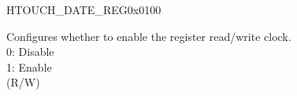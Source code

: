 \begin{register}{H}{TOUCH\_DATE\_REG}{0x0100}\label{regdesc:TOUCHDATEREG}
%
%
\regnewline%
\begin{regdesc}\begin{reglist}
\label{fielddesc:TOUCHCLKEN}\item [TOUCH\_CLK\_EN] Configures whether to enable the register read/write clock.\\
0: Disable \\
1: Enable\\
(R/W)
\end{reglist}\end{regdesc}
\end{register}
